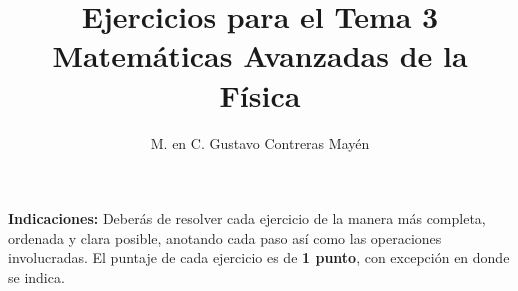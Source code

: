 
\title{Ejercicios para el Tema 3 \\[0.3em]  \large{Matemáticas Avanzadas de la Física}\vspace{-3ex}}
\author{M. en C. Gustavo Contreras Mayén}
\date{ }

\vspace{-4cm}
\maketitle
\fontsize{14}{14}\selectfont

\textbf{Indicaciones: } Deberás de resolver cada ejercicio de la manera más completa, ordenada y clara posible, anotando cada paso así como las operaciones involucradas. El puntaje de cada ejercicio es de \textbf{1 punto}, con excepción en donde se indica.

